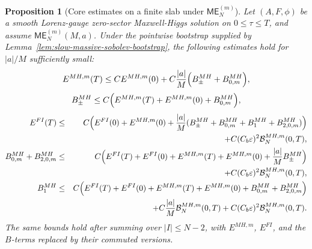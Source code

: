 \documentclass[10pt,a4paper]{amsart}
\newtheorem{proposition}{Proposition}
\newcommand{\ME}{\mathsf{ME}}
\begin{document}
\begin{proposition}[Core estimates on a finite slab under \(\ME^{(m)}_N\)]\label{prop:slow-core-estimates-full}
Let \((A,F,\phi)\) be a smooth Lorenz-gauge zero-sector Maxwell-Higgs solution on \(0\le\tau\le T\), and assume \(\ME^{(m)}_N(M,a)\).  Under the pointwise bootstrap supplied by Lemma~\ref{lem:slow-massive-sobolev-bootstrap}, the following estimates hold for \(|a|/M\) sufficiently small:
\begin{equation}\label{eq:slow-core-energy}
E^{MH,m}(T)
\le
C E^{MH,m}(0)+C\frac{|a|}{M}
\Bigl(B_{\pm}^{MH}+B_{0,m}^{MH}\Bigr),
\end{equation}
\begin{equation}\label{eq:slow-core-morawetz}
B_{\pm}^{MH}
\le
C\Bigl(E^{MH,m}(T)+E^{MH,m}(0)+B_{0,m}^{MH}\Bigr),
\end{equation}
\begin{eqnarray}
E^{FI}(T)
&\le&
C\Bigl(E^{FI}(0)+E^{MH,m}(0)
+\frac{|a|}{M}(B_{\pm}^{MH}+B_{0,m}^{MH}+B_1^{MH}+B_{2,0,m}^{MH})\Bigr)
\nonumber\\
&&+C(C_b\varepsilon)^2\mathcal B_N^{MH,m}(0,T),
\label{eq:slow-core-fi}\\
B_{0,m}^{MH}+B_{2,0,m}^{MH}
&\le&
C\Bigl(E^{FI}(T)+E^{FI}(0)+E^{MH,m}(T)+E^{MH,m}(0)
+\frac{|a|}{M}B_{\pm}^{MH}\Bigr)
\nonumber\\
&&+C(C_b\varepsilon)^2\mathcal B_N^{MH,m}(0,T),
\label{eq:slow-core-fi-mor}\\
B_1^{MH}
&\le&
C\Bigl(E^{FI}(T)+E^{FI}(0)+E^{MH,m}(T)+E^{MH,m}(0)
+B_{0,m}^{MH}+B_{2,0,m}^{MH}\Bigr)
\nonumber\\
&&+C\frac{|a|}{M}\mathcal B_N^{MH,m}(0,T)
+C(C_b\varepsilon)^2\mathcal B_N^{MH,m}(0,T).
\label{eq:slow-core-trap}
\end{eqnarray}
The same bounds hold after summing over \(|I|\le N-2\), with \(E^{MH,m}\), \(E^{FI}\), and the \(B\)-terms replaced by their commuted versions.
\end{proposition}
\end{document}

